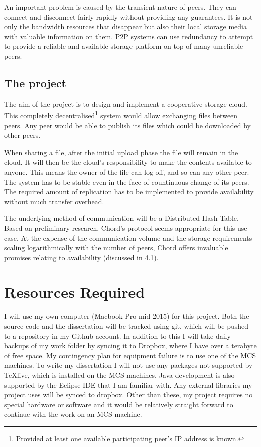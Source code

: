 \documentclass[12pt]{article}
\begin{document}
An important problem is caused by the transient nature of peers. They can connect and disconnect fairly rapidly without providing any guarantees. It is not only the bandwidth resources that disappear but also their local storage media with valuable information on them. P2P systems can use redundancy to attempt to provide a reliable and available storage platform on top of many unreliable peers.

\subsection{The project}
The aim of the project is to design and implement a cooperative storage cloud. This completely decentralised\footnote{Provided at least one available participating peer's IP address is known.} system would allow exchanging files between peers. Any peer would be able to publish its files which could be downloaded by other peers.


When sharing a file, after the initial upload phase the file will remain in the cloud. It will then be the cloud's responsibility to make the contents available to anyone. This means the owner of the file can log off, and so can any other peer. The system has to be stable even in the face of countinuous change of its peers. The required amount of replication has to be implemented to provide availability without much transfer overhead.

The underlying method of communication will be a Distributed Hash Table. Based on preliminary research, Chord's protocol seems appropriate for this use case. At the expense of the communication volume and the storage requirements scaling logarithmically with the number of peers, Chord offers invaluable promises relating to availability (discussed in 4.1).

\section{Resources Required}

I will use my own computer (Macbook Pro mid 2015) for this project. Both the source code and the dissertation will be tracked using git, which will be pushed to a repository in my Github account. In addition to this I will take daily backups of my work folder by syncing it to Dropbox, where I have over a terabyte of free space. My contingency plan for equipment failure is to use one of the MCS machines. To write my dissertation I will not use any packages not supported by \TeX live, which is installed on the MCS machines. Java development is also supported by the Eclipse IDE that I am familiar with. Any external libraries my project uses will be synced to dropbox. Other than these, my project requires no special hardware or software and it would be relatively straight forward to continue with the work on an MCS machine.
\end{document}
